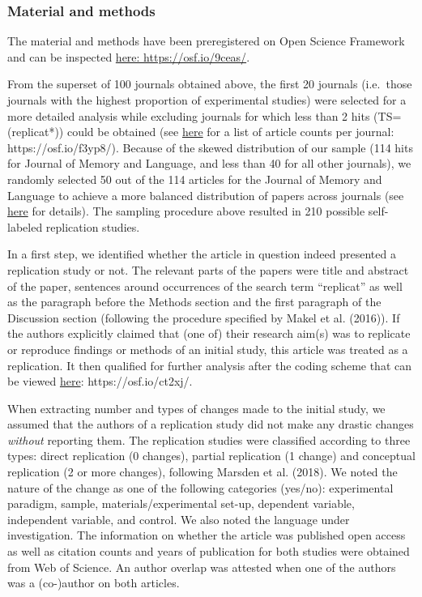 \documentclass[]{elsarticle} %
\begin{document}
\hypertarget{material-and-methods-1}{%
\subsubsection{Material and methods}\label{material-and-methods-1}}

The material and methods have been preregistered on Open Science
Framework and can be inspected \href{https://osf.io/9ceas/}{here:
https://osf.io/9ceas/}.

From the superset of 100 journals obtained above, the first 20 journals
(i.e.~those journals with the highest proportion of experimental
studies) were selected for a more detailed analysis while excluding
journals for which less than 2 hits (TS=(replicat*)) could be obtained
(see \href{https://osf.io/f3yp8/}{here} for a list of article counts per
journal: https://osf.io/f3yp8/). Because of the skewed distribution of
our sample (114 hits for Journal of Memory and Language, and less than
40 for all other journals), we randomly selected 50 out of the 114
articles for the Journal of Memory and Language to achieve a more
balanced distribution of papers across journals (see
\href{https://osf.io/6vfpe/}{here} for details). The sampling procedure
above resulted in 210 possible self-labeled replication studies.

In a first step, we identified whether the article in question indeed
presented a replication study or not. The relevant parts of the papers
were title and abstract of the paper, sentences around occurrences of
the search term ``replicat'' as well as the paragraph before the Methods
section and the first paragraph of the Discussion section (following the
procedure specified by Makel et al. (2016)). If the authors explicitly
claimed that (one of) their research aim(s) was to replicate or
reproduce findings or methods of an initial study, this article was
treated as a replication. It then qualified for further analysis after
the coding scheme that can be viewed \href{https://osf.io/ct2xj/}{here}:
https://osf.io/ct2xj/.

When extracting number and types of changes made to the initial study,
we assumed that the authors of a replication study did not make any
drastic changes \emph{without} reporting them. The replication studies
were classified according to three types: direct replication (0
changes), partial replication (1 change) and conceptual replication (2
or more changes), following Marsden et al. (2018). We noted the nature
of the change as one of the following categories (yes/no): experimental
paradigm, sample, materials/experimental set-up, dependent variable,
independent variable, and control. We also noted the language under
investigation. The information on whether the article was published open
access as well as citation counts and years of publication for both
studies were obtained from Web of Science. An author overlap was
attested when one of the authors was a (co-)author on both articles.
\end{document}
